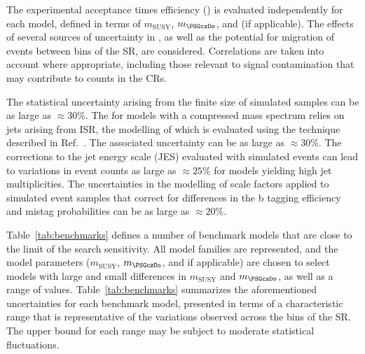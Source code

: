 The experimental acceptance times efficiency (\ate) is evaluated
independently for each model, defined in terms of $m_\text{SUSY}$,
$m_{\PSGczDo}$, and \ctau (if applicable). The effects of several
sources of uncertainty in \ate, as well as the potential for migration
of events between bins of the SR, are considered. Correlations are
taken into account where appropriate, including those relevant to
signal contamination that may contribute to counts in the CRs.

The statistical uncertainty arising from the finite size of simulated
samples can be as large as ${\approx}30\%$. The \ate for models with a
compressed mass spectrum relies on jets arising from ISR, the
modelling of which is evaluated using the technique described in
Ref.~\cite{Chatrchyan:2013xna}. The associated uncertainty can be as
large as ${\approx}30\%$. The corrections to the jet energy scale
(JES) evaluated with simulated events can lead to variations in event
counts as large as ${\approx}25\%$ for models yielding high jet
multiplicities. The uncertainties in the modelling of scale factors
applied to simulated event samples that correct for differences in the
b tagging efficiency and mistag probabilities can be as large as
${\approx}20\%$.

Table~\ref{tab:benchmarks} defines a number of benchmark models that
are close to the limit of the search sensitivity. All model families
are represented, and the model parameters ($m_\text{SUSY}$,
$m_{\PSGczDo}$, and \ctau if applicable) are chosen to select models
with large and small differences in $m_\text{SUSY}$ and
$m_{\PSGczDo}$, as well as a range of \ctau
values. Table~\ref{tab:benchmarks} summarizes the aforementioned
uncertainties for each benchmark model, presented in terms of a
characteristic range that is representative of the variations observed
across the bins of the SR. The upper bound for each range may be
subject to moderate statistical fluctuations.

